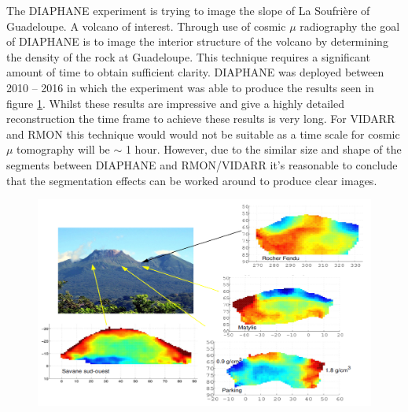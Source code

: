 The DIAPHANE experiment is trying to image the slope of La Soufrière of Guadeloupe. A volcano of interest. Through use of cosmic $\mu$ radiography the goal of DIAPHANE is to image the interior structure of the volcano by determining the density of the rock at Guadeloupe. This technique requires a significant amount of time to obtain sufficient clarity. DIAPHANE was deployed between 2010 -- 2016 in which the experiment was able to produce the results seen in figure \ref{fig:diaphaneStructualImaging}. Whilst these results are impressive and give a highly detailed reconstruction the time frame to achieve these results is very long. For VIDARR and RMON this technique would would not be suitable as a time scale for cosmic $\mu$ tomography will be $\sim$ 1 hour. However, due to the similar size and shape of the segments between DIAPHANE and RMON/VIDARR it's reasonable to conclude that the segmentation effects can be worked around to produce clear images. 

\begin{figure}[!h]
 \centering
 \includegraphics[width=1.0\linewidth]{Chapter5/Figs/Raster/diaphane_structuralImaging.png}
 \label{fig:diaphaneStructualImaging}
\end{figure}

